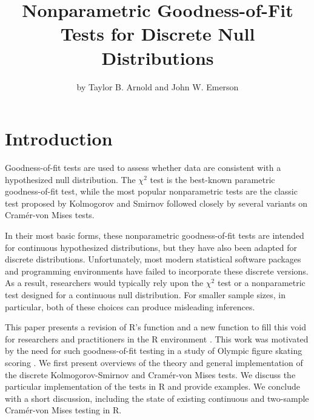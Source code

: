 \title{Nonparametric Goodness-of-Fit Tests for Discrete Null Distributions}
\author{by Taylor B. Arnold and John W. Emerson}

\maketitle


\section{Introduction}

Goodness-of-fit tests are used to assess whether data are consistent
with a hypothesized null distribution.  The $\chi^2$ test is the best-known
parametric goodness-of-fit test, while the most popular nonparametric tests
are the classic test proposed by Kolmogorov and Smirnov followed closely by
several variants on Cram\'{e}r-von Mises tests.

In their most basic forms, these nonparametric goodness-of-fit
tests are intended for continuous hypothesized distributions, but they have
also been adapted for discrete distributions.  Unfortunately,
most modern statistical software packages and programming environments
have failed to incorporate these discrete versions.  As a result,
researchers would typically rely upon the $\chi^2$ test or
a nonparametric test designed for a continuous null distribution.
For smaller sample sizes, in particular, both of these choices can produce
misleading inferences.

This paper presents a revision of R's
 function and a new  function to
fill this void for researchers and practitioners in the R environment
\citep{R2010}. This
work was motivated by the need for such goodness-of-fit testing in a study
of Olympic figure skating scoring \citep{emersonarnold2010}.  
We first present overviews of the theory and general implementation of the
discrete Kolmogorov-Smirnov and Cram\'{e}r-von Mises tests.  We discuss
the particular implementation of the tests in R and provide examples.  We
conclude with a short discussion, including the state of existing continuous
and two-sample Cram\'{e}r-von Mises testing in R.

